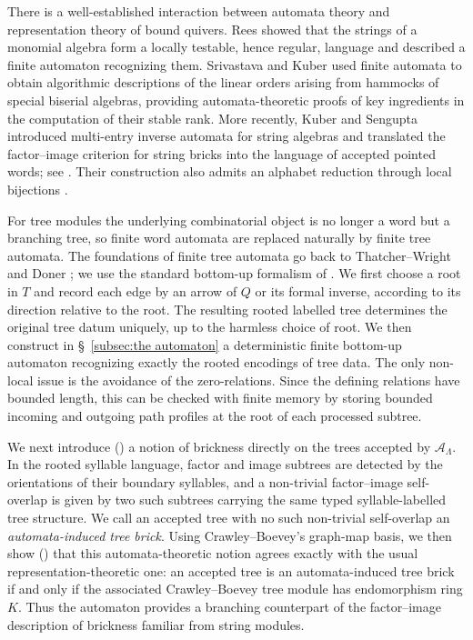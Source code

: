 \documentclass[11pt,a4paper]{amsart}
\theoremstyle{definition}
\theoremstyle{plain}
\theoremstyle{remark}
\numberwithin{equation}{section}
\begin{document}
There is a well-established interaction between automata theory and representation theory of bound quivers. Rees \cite{Rees08} showed that the strings of a monomial algebra form a locally testable, hence regular, language and described a finite automaton recognizing them. Srivastava and Kuber \cite{SrivastavaKuber2025} used finite automata to obtain algorithmic descriptions of the linear orders arising from hammocks of special biserial algebras, providing automata-theoretic proofs of key ingredients in the computation of their stable rank. More recently, Kuber and Sengupta introduced multi-entry inverse automata for string algebras and translated the factor--image criterion for string bricks into the language of accepted pointed words; see \cite[Theorems~5.6 and~5.10]{KuberSengupta2026}. Their construction also admits an alphabet reduction through local bijections \cite[Definition~4.11 and Corollary~4.13]{KuberSengupta2026}.

For tree modules the underlying combinatorial object is no longer a word but a branching tree, so finite word automata are replaced naturally by finite tree automata. The foundations of finite tree automata go back to Thatcher--Wright \cite{ThatcherWright68} and Doner \cite{Doner70}; we use the standard bottom-up formalism of \cite{TATA}. We first choose a root in $T$ and record each edge by an arrow of $Q$ or its formal inverse, according to its direction relative to the root. The resulting rooted labelled tree determines the original tree datum uniquely, up to the harmless choice of root. We then construct in \S~\ref{subsec:the automaton} a deterministic finite bottom-up automaton recognizing exactly the rooted encodings of tree data. The only non-local issue is the avoidance of the zero-relations. Since the defining relations have bounded length, this can be checked with finite memory by storing bounded incoming and outgoing path profiles at the root of each processed subtree.

We next introduce () a notion of brickness directly on the trees accepted by $\mathcal A_\Lambda$. In the rooted syllable language, factor and image subtrees are detected by the orientations of their boundary syllables, and a non-trivial factor--image self-overlap is given by two such subtrees carrying the same typed syllable-labelled tree structure. We call an accepted tree with no such non-trivial self-overlap an \emph{automata-induced tree brick}. Using Crawley--Boevey's graph-map basis, we then show () that this automata-theoretic notion agrees exactly with the usual representation-theoretic one: an accepted tree is an automata-induced tree brick if and only if the associated Crawley--Boevey tree module has endomorphism ring $K$. Thus the automaton provides a branching counterpart of the factor--image description of brickness familiar from string modules.
\end{document}
